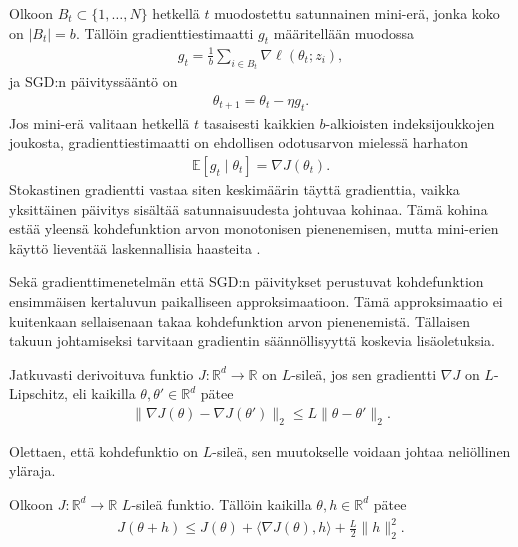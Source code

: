 Olkoon \(B_t \subset \{1,\dots,N\}\) hetkellä \(t\) muodostettu
satunnainen mini-erä, jonka koko on \(|B_t|=b\). Tällöin gradienttiestimaatti
\(g_t\) määritellään muodossa
\begin{align*}
  g_t
  =
  \frac{1}{b}
  \sum_{i \in B_t}
  \nabla \ell(\theta_t; z_i),
\end{align*}
ja SGD:n päivityssääntö on
\begin{align*}
  \theta_{t+1}
  =
  \theta_t - \eta g_t.
\end{align*}
Jos mini-erä valitaan hetkellä \(t\) tasaisesti kaikkien
\(b\)-alkioisten indeksijoukkojen joukosta, gradienttiestimaatti on
ehdollisen odotusarvon mielessä harhaton \cite{bottou2018optimization}
\begin{align*}
  \mathbb{E}[g_t \mid \theta_t]
  =
  \nabla J(\theta_t).
\end{align*}
Stokastinen gradientti vastaa siten keskimäärin täyttä gradienttia,
vaikka yksittäinen päivitys sisältää satunnaisuudesta johtuvaa kohinaa.
Tämä kohina estää yleensä kohdefunktion arvon monotonisen pienenemisen,
mutta mini-erien käyttö lieventää
laskennallisia haasteita \cite{bottou1998online,goodfellow2016deep}.

Sekä gradienttimenetelmän että SGD:n päivitykset perustuvat
kohdefunktion ensimmäisen kertaluvun paikalliseen approksimaatioon.
Tämä approksimaatio ei kuitenkaan sellaisenaan takaa kohdefunktion
arvon pienenemistä. Tällaisen takuun johtamiseksi tarvitaan gradientin
säännöllisyyttä koskevia lisäoletuksia.
\begin{definition}\label{def:l_smooth}
  Jatkuvasti derivoituva funktio \(J : \mathbb{R}^d \to \mathbb{R}\) on
  \(L\)-sileä, jos sen gradientti \(\nabla J\) on \(L\)-Lipschitz, eli
  kaikilla \(\theta,\theta' \in \mathbb{R}^d\) pätee
  \begin{align*}
    \|\nabla J(\theta) - \nabla J(\theta')\|_2
    \le
    L\|\theta-\theta'\|_2.
  \end{align*}
\end{definition}

Olettaen, että kohdefunktio on \(L\)-sileä, sen muutokselle voidaan
johtaa neliöllinen yläraja.

\begin{lemma}\label{lemma:quadratic_upper_bound}
  Olkoon \(J:\mathbb{R}^d \to \mathbb{R}\) \(L\)-sileä funktio. Tällöin
  kaikilla \(\theta,h \in \mathbb{R}^d\) pätee
  \begin{align*}
    J(\theta+h)
    \le
    J(\theta)
    +
    \langle \nabla J(\theta), h\rangle
    +
    \frac{L}{2}\|h\|_2^2.
  \end{align*}
\end{lemma}


